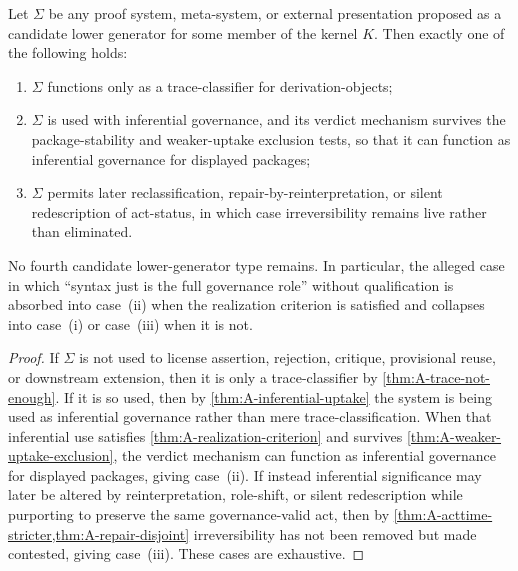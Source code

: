 \begin{theorem}
\label{thm:A-proofsystem-trichotomy}
Let $\Sigma$ be any proof system, meta-system, or external presentation proposed as a candidate
lower generator for some member of the kernel $K$. Then exactly one of the following holds:
\begin{enumerate}[label=(\roman*), leftmargin=2.5em]
    \item $\Sigma$ functions only as a trace-classifier for derivation-objects;
    \item $\Sigma$ is used with inferential governance, and its verdict mechanism survives the package-stability and weaker-uptake exclusion tests, so that it can function as inferential governance for displayed packages;
    \item $\Sigma$ permits later reclassification, repair-by-reinterpretation, or silent redescription of act-status, in which case irreversibility remains live rather than eliminated.
\end{enumerate}
No fourth candidate lower-generator type remains. In particular, the alleged case in which ``syntax just is the full governance role'' without qualification is absorbed into case~(ii) when the realization criterion is satisfied and collapses into case~(i) or case~(iii) when it is not.
\end{theorem}

\begin{proof}
If $\Sigma$ is not used to license assertion, rejection, critique, provisional reuse, or downstream extension, then it is only a trace-classifier by \cref{thm:A-trace-not-enough}. If it is so used, then by \cref{thm:A-inferential-uptake} the system is being used as inferential governance rather than mere trace-classification. When that inferential use satisfies \cref{thm:A-realization-criterion} and survives \cref{thm:A-weaker-uptake-exclusion}, the verdict mechanism can function as inferential governance for displayed packages, giving case~(ii). If instead inferential significance may later be altered by reinterpretation, role-shift, or silent redescription while purporting to preserve the same governance-valid act, then by \cref{thm:A-acttime-stricter,thm:A-repair-disjoint} irreversibility has not been removed but made contested, giving case~(iii). These cases are exhaustive.
\end{proof}

